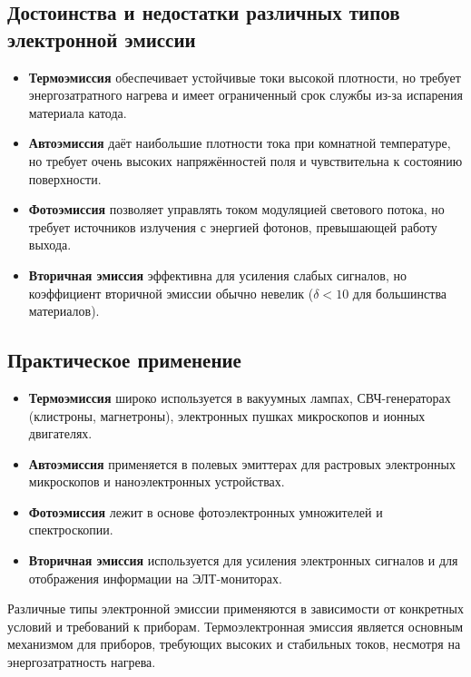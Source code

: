 \documentclass[12pt]{article}
\begin{document}
\subsection*{Достоинства и недостатки различных типов электронной эмиссии}

\begin{itemize}
    \item \textbf{Термоэмиссия} обеспечивает устойчивые токи высокой плотности, но требует энергозатратного нагрева и имеет ограниченный срок службы из-за испарения материала катода.    
    \item \textbf{Автоэмиссия} даёт наибольшие плотности тока при комнатной температуре, но требует очень высоких напряжённостей поля и чувствительна к состоянию поверхности.
    \item \textbf{Фотоэмиссия} позволяет управлять током модуляцией светового потока, но требует источников излучения с энергией фотонов, превышающей работу выхода.
    \item \textbf{Вторичная эмиссия} эффективна для усиления слабых сигналов, но коэффициент вторичной эмиссии обычно невелик ($\delta < 10$ для большинства материалов).
\end{itemize}

\subsection*{Практическое применение}
\begin{itemize}
    \item \textbf{Термоэмиссия} широко используется в вакуумных лампах, СВЧ-генераторах (клистроны, магнетроны), электронных пушках микроскопов и ионных двигателях.
    \item \textbf{Автоэмиссия} применяется в полевых эмиттерах для растровых электронных микроскопов и наноэлектронных устройствах.
    \item \textbf{Фотоэмиссия} лежит в основе фотоэлектронных умножителей и спектроскопии.
    \item \textbf{Вторичная эмиссия} используется для усиления электронных сигналов и для отображения информации на ЭЛТ-мониторах.
\end{itemize}
Различные типы электронной эмиссии применяются в зависимости от конкретных условий и требований к приборам. Термоэлектронная эмиссия является основным механизмом для приборов, требующих высоких и стабильных токов, несмотря на энергозатратность нагрева.
\end{document}
